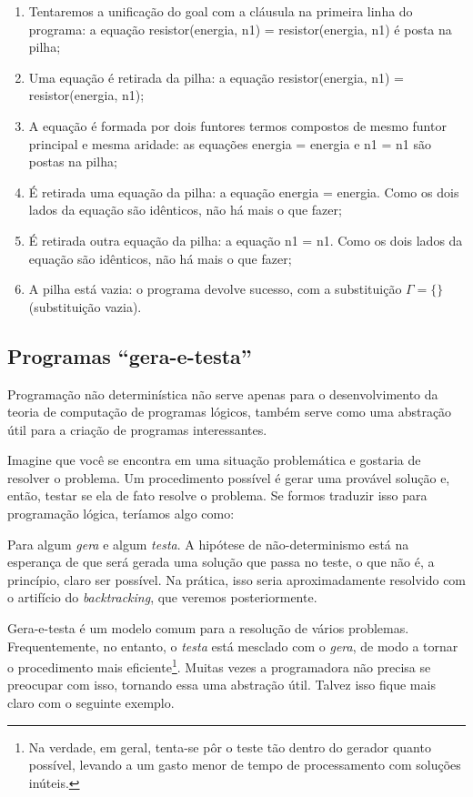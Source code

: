 \documentclass{article}
\theoremstyle{remark}
\theoremstyle{theorem}
\begin{document}
  \begin{enumerate}
    \item Tentaremos a unificação do goal com a cláusula na primeira linha do programa: a equação resistor(energia, n1) = resistor(energia, n1) é posta na pilha;
    \item Uma equação é retirada da pilha: a equação resistor(energia, n1) = resistor(energia, n1);
    \item A equação é formada por dois funtores termos compostos de mesmo funtor principal e mesma aridade: as equações energia  = energia e n1 = n1 são postas na pilha;
    \item É retirada uma equação da pilha: a equação energia = energia. Como os dois lados da equação são idênticos, não há mais o que fazer;
    \item É retirada outra equação da pilha: a equação n1 = n1. Como os dois lados da equação são idênticos, não há mais o que fazer;
    \item A pilha está vazia: o programa devolve sucesso, com a substituição $\Gamma = \{\}$ (substituição vazia).
  \end{enumerate}


  \subsection{Programas ``gera-e-testa''}

  Programação não determinística não serve apenas para o desenvolvimento da teoria de computação de programas lógicos, também serve como uma abstração útil para a criação de programas interessantes.

  Imagine que você se encontra em uma situação problemática e gostaria de resolver o problema. Um procedimento possível é gerar uma provável solução e, então, testar se ela de fato resolve o problema. Se formos traduzir isso para programação lógica, teríamos algo como:



Para algum \textit{gera} e algum \textit{testa}. A hipótese de não-determinismo está na esperança de que será gerada uma solução que passa no teste, o que não é, a princípio, claro ser possível. Na prática, isso seria aproximadamente resolvido com o artifício do \textit{backtracking}, que veremos posteriormente.

Gera-e-testa é um modelo comum para a resolução de vários problemas. Frequentemente, no entanto, o \textit{testa} está mesclado com o \textit{gera}, de modo a tornar o procedimento mais eficiente\footnote{Na verdade, em geral, tenta-se pôr o teste tão dentro do gerador quanto possível, levando a um gasto menor de tempo de processamento com soluções inúteis.}. Muitas vezes a programadora não precisa se preocupar com isso, tornando essa uma abstração útil. Talvez isso fique mais claro com o seguinte exemplo.
\end{document}
